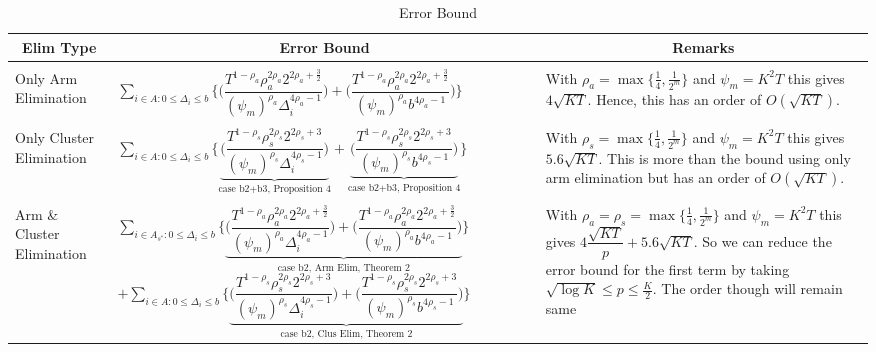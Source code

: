 \begin{remark}
\begin{table}
\caption{Error Bound}
\label{App:E:table:3}
\begin{center}
\begin{tabular}{p{1.4cm}p{10.2cm}p{3.5cm}}
\multicolumn{1}{c}{\bf Elim Type} &\multicolumn{1}{c}{\bf Error Bound} &\multicolumn{1}{c}{\bf Remarks} \\
\hline \\
Only Arm Elimination	&$\sum_{i\in A:0\leq\Delta_{i}\leq b}\bigg\lbrace\bigg(\dfrac{T^{1-\rho_{a}}\rho_{a}^{2\rho_{a}}2^{2\rho_{a}+\frac{3}{2}}}{(\psi_{m})^{\rho_{a}}\Delta_{i}^{4\rho_{a} -1}} \bigg) + \bigg( \dfrac{T^{1-\rho_{a}}\rho_{a}^{2\rho_{a}}2^{2\rho_{a}+\frac{3}{2}}}{(\psi_{m})^{\rho_{a}}b^{4\rho_{a} -1}} \bigg)\bigg\rbrace$ & With $\rho_{a}=\max\lbrace\frac{1}{4},\frac{1}{2^{m}}\rbrace$ and $\psi_{m}=K^{2}T$ this gives $4\sqrt{KT}$. Hence, this has an order of $O(\sqrt{KT})$.\\
\hline\\
Only Cluster Elimination	&$\sum_{i\in A:0\leq\Delta_{i}\leq b}\bigg\lbrace\underbrace{\bigg(\dfrac{T^{1-\rho_{s}}\rho_{s}^{2\rho_{s}}2^{2\rho_{s}+3}}{(\psi_{m})^{\rho_{s}}\Delta_{i}^{4\rho_{s} -1}} \bigg)}_{\text{case b2+b3, Proposition 4}} +\underbrace{\bigg(\dfrac{T^{1-\rho_{s}}\rho_{s}^{2\rho_{s}}2^{2\rho_{s}+3}}{(\psi_{m})^{\rho_{s}}b^{4\rho_{s} -1}} \bigg)}_{\text{case b2+b3, Proposition 4}}\bigg\rbrace$ & With $\rho_{s}=\max\lbrace\frac{1}{4},\frac{1}{2^{m}}\rbrace$ and $\psi_{m}=K^{2}T$ this gives $5.6\sqrt{KT}$. This is more than the bound using only arm elimination but has an order of $O(\sqrt{KT})$.\\
\hline\\
Arm \& Cluster Elimination 	&$\sum_{i\in A_{s^{*}}:0\leq\Delta_{i}\leq b}\bigg\lbrace \underbrace{\bigg(\dfrac{T^{1-\rho_{a}}\rho_{a}^{2\rho_{a}}2^{2\rho_{a}+\frac{3}{2}}}{(\psi_{m})^{\rho_{a}}\Delta_{i}^{4\rho_{a}-1}} \bigg)+\bigg(\dfrac{T^{1-\rho_{a}}\rho_{a}^{2\rho_{a}}2^{2\rho_{a}+\frac{3}{2}}}{(\psi_{m})^{\rho_{a}}b^{4\rho_{a} -1}} \bigg)}_{\text{case b2, Arm Elim, Theorem 2}}\bigg\rbrace $ $+ \sum_{i\in A:0\leq\Delta_{i}\leq b}\bigg\lbrace\underbrace{\bigg(\dfrac{T^{1-\rho_{s}}\rho_{s}^{2\rho_{s}}2^{2\rho_{s}+3}}{(\psi_{m})^{\rho_{s}}\Delta_{i}^{4\rho_{s}-1}} \bigg)+\bigg(\dfrac{T^{1-\rho_{s}}\rho_{s}^{2\rho_{s}}2^{2\rho_{s}+3}}{(\psi_{m})^{\rho_{s}}b^{4\rho_{s} -1}} \bigg)}_{\text{case b2, Clus Elim, Theorem 2}} \bigg\rbrace$ & With $\rho_{a}=\rho_{s}=\max\lbrace\frac{1}{4},\frac{1}{2^{m}}\rbrace$ and $\psi_{m}=K^{2}T$ this gives $4\dfrac{\sqrt{KT}}{p} + 5.6\sqrt{KT}$. So we can reduce the error bound for the first term by taking $\sqrt{\log K}\leq p\leq \frac{K}{2}$. The order though will remain same 

\end{tabular}
\end{center}
\end{table}
\end{remark}
